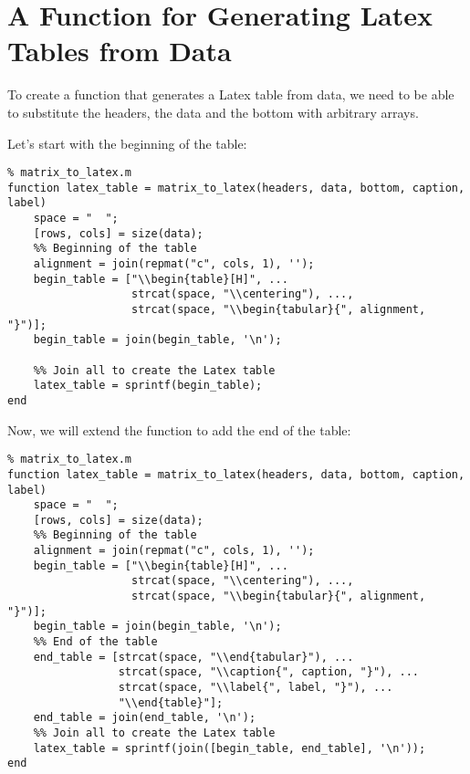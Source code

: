 \documentclass[12pt, a4paper]{article}
\begin{document}
\section{A Function for Generating Latex Tables from Data}
\label{sec:org3c50777}
To create a function that generates a Latex table from data, we need to be able to substitute the headers, the data and the bottom with arbitrary arrays.

Let's start with the beginning of the table:
\lstset{language=matlab,label= ,caption= ,captionpos=b,firstnumber=1,numbers=left,style=Matlab-editor}
\begin{lstlisting}
% matrix_to_latex.m
function latex_table = matrix_to_latex(headers, data, bottom, caption, label)
    space = "  ";
    [rows, cols] = size(data);
    %% Beginning of the table
    alignment = join(repmat("c", cols, 1), '');
    begin_table = ["\\begin{table}[H]", ...
                   strcat(space, "\\centering"), ...,
                   strcat(space, "\\begin{tabular}{", alignment, "}")];
    begin_table = join(begin_table, '\n');

    %% Join all to create the Latex table
    latex_table = sprintf(begin_table);
end
\end{lstlisting}

Now, we will extend the function to add the end of the table:
\lstset{language=matlab,label= ,caption= ,captionpos=b,firstnumber=1,numbers=left,style=Matlab-editor}
\begin{lstlisting}
% matrix_to_latex.m
function latex_table = matrix_to_latex(headers, data, bottom, caption, label)
    space = "  ";
    [rows, cols] = size(data);
    %% Beginning of the table
    alignment = join(repmat("c", cols, 1), '');
    begin_table = ["\\begin{table}[H]", ...
                   strcat(space, "\\centering"), ...,
                   strcat(space, "\\begin{tabular}{", alignment, "}")];
    begin_table = join(begin_table, '\n');
    %% End of the table
    end_table = [strcat(space, "\\end{tabular}"), ...
                 strcat(space, "\\caption{", caption, "}"), ...
                 strcat(space, "\\label{", label, "}"), ...
                 "\\end{table}"];
    end_table = join(end_table, '\n');
    %% Join all to create the Latex table
    latex_table = sprintf(join([begin_table, end_table], '\n'));
end
\end{lstlisting}
\end{document}
